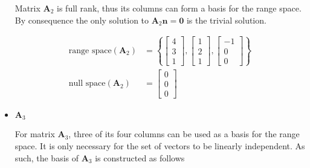 \begin{itemize}
 Matrix $\mathbf{A}_2$ is full rank,
 thus its columns can form a basis for the range space.
 By consequence the only solution to $\mathbf{A}_2 \mathbf{n} = \mathbf{0}$
 is the trivial solution.

 \begin{align*}
 \text{range space}(\mathbf{A}_2)
    &=
    \left \{
    \begin{bmatrix} 4 \\ 3 \\ 1 \end{bmatrix},
    \begin{bmatrix} 1\\ 2 \\ 1  \end{bmatrix},
    \begin{bmatrix} -1\\  0\\ 0 \end{bmatrix}
    \right \}
    \\
    \text{null space}(\mathbf{A}_2) &= \begin{bmatrix}
                                        0\\0\\0
                                       \end{bmatrix}
\end{align*}

 \item $\mathbf{A}_3$

 For matrix $\mathbf{A}_3$, three of its four columns can be
used as a basis for the range space. It is only necessary
for the set of vectors to be linearly independent. As such,
the basis of $\mathbf{A}_3$ is constructed as follows


\end{itemize}
